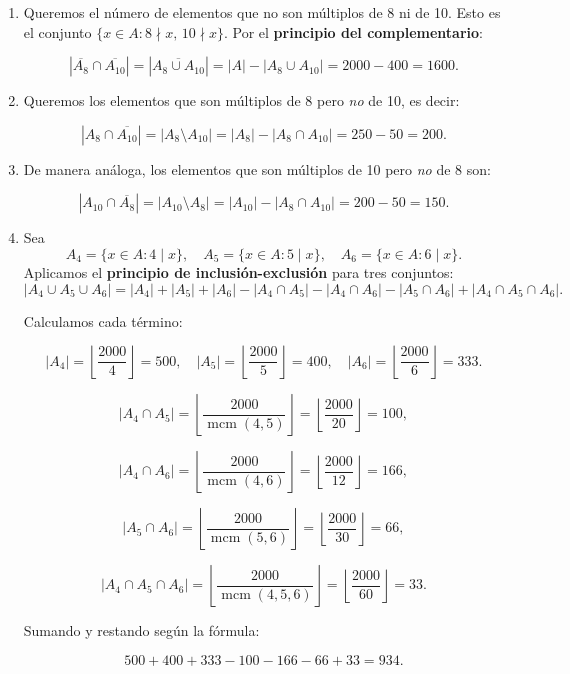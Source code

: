 \documentclass[a4paper,12pt]{article}
\begin{document}
\begin{ejercicio}[title=Ejercicio 9]

\begin{enumerate}

\item[d)]
Queremos el número de elementos que no son múltiplos de 8 ni de 10.
Esto es el conjunto $\{x \in A: 8 \nmid x,\, 10 \nmid x\}$.
Por el \textbf{principio del complementario}:

\[
|\overline{A_8} \cap \overline{A_{10}}| = |\overline{A_8 \cup A_{10}}| = |A| - |A_8 \cup A_{10}| = 2000 - 400 = \boxed{1600}.
\]

\item[e)]
Queremos los elementos que son múltiplos de 8 pero \emph{no} de 10, es decir:

\[
|A_8 \cap \overline{A_{10}}| = |A_8 \setminus A_{10}| = |A_8| - |A_8 \cap A_{10}| = 250 - 50 = \boxed{200}.
\]

\item[f)]
De manera análoga, los elementos que son múltiplos de 10 pero \emph{no} de 8 son:

\[
|A_{10} \cap \overline{A_8}| = |A_{10} \setminus A_8| = |A_{10}| - |A_8 \cap A_{10}| = 200 - 50 = \boxed{150}.
\]

\item[g)]
Sea 
\[
A_4 = \{x \in A : 4 \mid x\}, \quad 
A_5 = \{x \in A : 5 \mid x\}, \quad 
A_6 = \{x \in A : 6 \mid x\}.
\]  
Aplicamos el \textbf{principio de inclusión-exclusión} para tres conjuntos:
\[
|A_4 \cup A_5 \cup A_6| = |A_4| + |A_5| + |A_6| - |A_4 \cap A_5| - |A_4 \cap A_6| - |A_5 \cap A_6| + |A_4 \cap A_5 \cap A_6|.
\]

Calculamos cada término:

\[
|A_4| = \left\lfloor \frac{2000}{4} \right\rfloor = 500, \quad
|A_5| = \left\lfloor \frac{2000}{5} \right\rfloor = 400, \quad
|A_6| = \left\lfloor \frac{2000}{6} \right\rfloor = 333.
\]

\[
|A_4 \cap A_5| = \left\lfloor \frac{2000}{\operatorname{mcm}(4,5)} \right\rfloor = \left\lfloor \frac{2000}{20} \right\rfloor = 100,
\]

\[
|A_4 \cap A_6| = \left\lfloor \frac{2000}{\operatorname{mcm}(4,6)} \right\rfloor = \left\lfloor \frac{2000}{12} \right\rfloor = 166,
\]

\[
|A_5 \cap A_6| = \left\lfloor \frac{2000}{\operatorname{mcm}(5,6)} \right\rfloor = \left\lfloor \frac{2000}{30} \right\rfloor = 66,
\]

\[
|A_4 \cap A_5 \cap A_6| = \left\lfloor \frac{2000}{\operatorname{mcm}(4,5,6)} \right\rfloor = \left\lfloor \frac{2000}{60} \right\rfloor = 33.
\]

Sumando y restando según la fórmula:

\[
500 + 400 + 333 - 100 - 166 - 66 + 33 = \boxed{934}.
\]

\end{enumerate}

\end{ejercicio}
\end{document}
